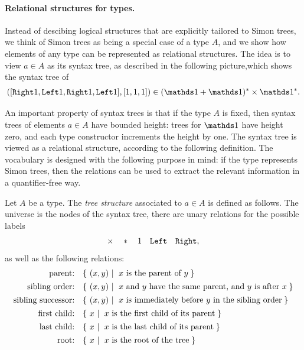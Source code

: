 \paragraph*{Relational structures for types.} Instead of descibing logical structures that are explicitly tailored to Simon trees, we think of Simon trees as being a special case of a type $A$, and we show how elements of any type  can be  represented as relational structures.  The idea is to view $a \in A$  as its syntax tree, as described in the following picture,which shows the syntax tree of
\begin{align*}
([\rightterm 1, \leftterm 1, \rightterm 1, \leftterm 1],[1,1,1]) \in (\onetype + \onetype)^*  \times \onetype^*.
\end{align*}

An important property of syntax trees is that if the type $A$ is fixed, then syntax trees of elements $a \in A$ have bounded height: trees for $\onetype$ have height zero, and each type constructor increments the height by one. The syntax tree is viewed as a relational structure, according to the following definition.  The vocabulary is designed with the following purpose in mind: if the type represents Simon trees, then the relations can be used to extract the relevant information in a quantifier-free way.

\begin{definition}
     \label{def:tree-model} Let $A$ be a type. The \emph{tree structure} associated to $a \in A$ is defined as follows. The universe is the nodes of the  syntax tree, there are unary relations for the  possible labels
    \begin{align*}
    \times \quad * \quad 1 \quad  \mathtt{Left} \quad \mathtt{Right},
    \end{align*}
    as well as the following relations:
        \begin{align*}
        \text{parent:} \quad &  \setbuild{(x,y)}{$x$ is the parent of $y$}\\
        \text{sibling order:} \quad & \setbuild{(x,y)}{$x$ and $y$ have the same parent, and $y$ is after $x$}\\
        \text{sibling successor:} \quad & \setbuild{(x,y)}{$x$ is immediately before $y$ in the sibling order} \\
        \text{first child:} \quad & \setbuild{x}{$x$ is the first child of its parent} \\
        \text{last child:} \quad & \setbuild{x}{$x$ is the last child of its parent} \\
        \text{root:} \quad & \setbuild{x}{$x$ is the root of the tree} 
        \end{align*}
\end{definition}

